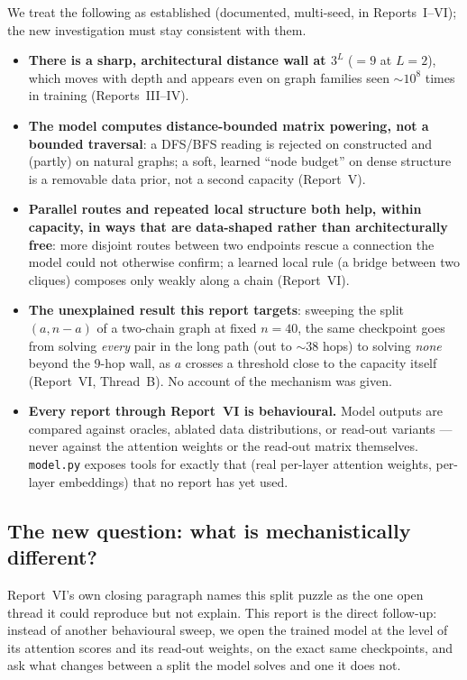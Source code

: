 \documentclass[11pt,a4paper]{article}
\begin{document}
We treat the following as established (documented, multi-seed, in Reports~I--VI);
the new investigation must stay consistent with them.

\begin{itemize}\setlength\itemsep{0.2em}
  \item \textbf{There is a sharp, architectural distance wall at $3^L$} ($=9$ at
        $L=2$), which moves with depth and appears even on graph families seen
        $\sim10^8$ times in training (Reports~III--IV).
  \item \textbf{The model computes distance-bounded matrix powering, not a bounded
        traversal}: a DFS/BFS reading is rejected on constructed and (partly) on
        natural graphs; a soft, learned ``node budget'' on dense structure is a
        removable data prior, not a second capacity (Report~V).
  \item \textbf{Parallel routes and repeated local structure both help, within
        capacity, in ways that are data-shaped rather than architecturally free}:
        more disjoint routes between two endpoints rescue a connection the model
        could not otherwise confirm; a learned local rule (a bridge between two
        cliques) composes only weakly along a chain (Report~VI).
  \item \textbf{The unexplained result this report targets}: sweeping the split
        $(a, n-a)$ of a two-chain graph at fixed $n=40$, the same checkpoint goes
        from solving \emph{every} pair in the long path (out to $\sim38$ hops) to
        solving \emph{none} beyond the $9$-hop wall, as $a$ crosses a threshold
        close to the capacity itself (Report~VI, Thread~B). No account of the
        mechanism was given.
  \item \textbf{Every report through Report~VI is behavioural.} Model outputs are
        compared against oracles, ablated data distributions, or read-out variants
        --- never against the attention weights or the read-out matrix themselves.
        \texttt{model.py} exposes tools for exactly that (real per-layer attention
        weights, per-layer embeddings) that no report has yet used.
\end{itemize}

\subsection{The new question: what is mechanistically different?}
\label{sec:question}

Report~VI's own closing paragraph names this split puzzle as the one open thread it
could reproduce but not explain. This report is the direct follow-up: instead of
another behavioural sweep, we open the trained model at the level of its attention
scores and its read-out weights, on the exact same checkpoints, and ask what
changes between a split the model solves and one it does not.
\end{document}
